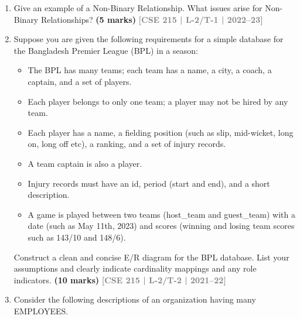 \documentclass[12pt]{article}
\newcommand{\yr}[1]{\hfill\textcolor{gray}{\small\textbf{[#1]}}}
\newcommand{\mk}[1]{\textcolor{orange!70!black}{\small\textbf{(#1 marks)}}}
\begin{document}
\begin{enumerate}
\item Give an example of a Non-Binary Relationship. What issues arise for Non-Binary Relationships?
\mk{5} \yr{CSE 215 | L-2/T-1 | 2022--23}


\item Suppose you are given the following requirements for a simple database for the Bangladesh Premier League (BPL) in a season:
\begin{itemize}[leftmargin=1.5em,itemsep=1pt]
  \item The BPL has many teams; each team has a name, a city, a coach, a captain, and a set of players.
  \item Each player belongs to only one team; a player may not be hired by any team.
  \item Each player has a name, a fielding position (such as slip, mid-wicket, long on, long off etc), a ranking, and a set of injury records.
  \item A team captain is also a player.
  \item Injury records must have an id, period (start and end), and a short description.
  \item A game is played between two teams (host\_team and guest\_team) with a date (such as May 11th, 2023) and scores (winning and losing team scores such as 143/10 and 148/6).
\end{itemize}
Construct a clean and concise E/R diagram for the BPL database. List your assumptions and clearly indicate cardinality mappings and any role indicators.
\mk{10} \yr{CSE 215 | L-2/T-2 | 2021--22}


\item Consider the following descriptions of an organization having many EMPLOYEES.


\end{enumerate}
\end{document}
